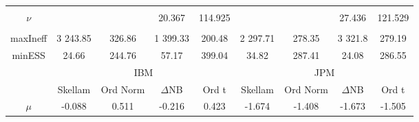 \begin{footnotesize}
\begin{singlespace}
\begin{tabular}{ccccccccc}
 & \begin{tiny} [-0.138,0.057] \end{tiny}  & \begin{tiny} [-0.107,0.04] \end{tiny}  & \begin{tiny} [-0.137,0.061] \end{tiny}  & \begin{tiny} [-0.107,0.04] \end{tiny}  & \begin{tiny} [-0.259,-0.115] \end{tiny}  & \begin{tiny} [-0.213,-0.107] \end{tiny}  & \begin{tiny} [-0.26,-0.115] \end{tiny}  & \begin{tiny} [-0.208,-0.103] \end{tiny}  \\ 
$\nu$ &  &  & 20.367 &  114.925 &  &  & 27.436 &  121.529 \\ 
 &  &  & \begin{tiny} [15,25.8] \end{tiny}  & \begin{tiny} [93, 128] \end{tiny}  &  &  & \begin{tiny} [21.4,33.8] \end{tiny}  & \begin{tiny} [ 109.9, 128] \end{tiny}  \\  \midrule 
maxIneff & 3 243.85 &  326.86 & 1 399.33 &  200.48 & 2 297.71 &  278.35 & 3 321.8 &  279.19 \\ 
minESS & 24.66 &  244.76 & 57.17 &  399.04 & 34.82 &  287.41 & 24.08 &  286.55 \\ \midrule 
 & \multicolumn{4}{c}{IBM}& \multicolumn{4}{c}{JPM} \\ 
\cmidrule(r){2-5} \cmidrule(r){6-9} &  \multicolumn{1}{c}{Skellam}&  \multicolumn{1}{c}{Ord Norm}&  \multicolumn{1}{c}{$\Delta$NB}&  \multicolumn{1}{c}{Ord t}&  \multicolumn{1}{c}{Skellam}&  \multicolumn{1}{c}{Ord Norm}&  \multicolumn{1}{c}{$\Delta$NB}&  \multicolumn{1}{c}{Ord t} \\ \midrule 
 $ \mu $ & -0.088 & 0.511 & -0.216 & 0.423 & -1.674 & -1.408 & -1.673 & -1.505 \\ 

\end{tabular}
\end{singlespace}
\end{footnotesize}
